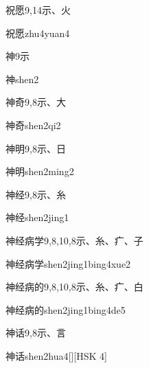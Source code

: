 \begin{entry}{祝愿}{9,14}{⽰、⽕}
  \begin{phonetics}{祝愿}{zhu4yuan4}
  \end{phonetics}
\end{entry}

\begin{entry}{神}{9}{⽰}
  \begin{phonetics}{神}{shen2}
  \end{phonetics}
\end{entry}

\begin{entry}{神奇}{9,8}{⽰、⼤}
  \begin{phonetics}{神奇}{shen2qi2}
  \end{phonetics}
\end{entry}

\begin{entry}{神明}{9,8}{⽰、⽇}
  \begin{phonetics}{神明}{shen2ming2}
  \end{phonetics}
\end{entry}

\begin{entry}{神经}{9,8}{⽰、⽷}
  \begin{phonetics}{神经}{shen2jing1}
  \end{phonetics}
\end{entry}

\begin{entry}{神经病学}{9,8,10,8}{⽰、⽷、⽧、⼦}
  \begin{phonetics}{神经病学}{shen2jing1bing4xue2}
  \end{phonetics}
\end{entry}

\begin{entry}{神经病的}{9,8,10,8}{⽰、⽷、⽧、⽩}
  \begin{phonetics}{神经病的}{shen2jing1bing4de5}
  \end{phonetics}
\end{entry}

\begin{entry}{神话}{9,8}{⽰、⾔}
  \begin{phonetics}{神话}{shen2hua4}[][HSK 4]
  \end{phonetics}
\end{entry}

